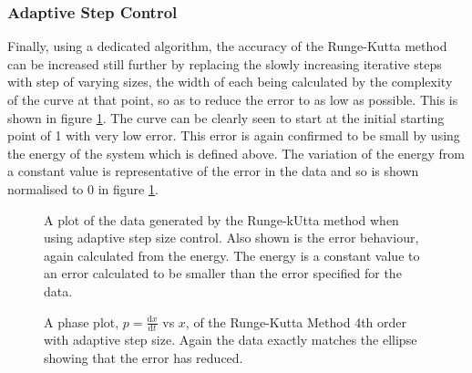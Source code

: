 \documentclass[11pt]{article} %
\newcommand{\inputTikZ}[1]{%
	}
\newcommand{\inputTikZ}[1]{%
		\beginpgfgraphicnamed{#1-external}%
		\endpgfgraphicnamed%
	}
\newcommand{\dx}[2]{\frac{\textrm{d} #1}{\textrm{d} #2}} %
\begin{document}
\subsubsection{Adaptive Step Control}
Finally, using a dedicated algorithm, the accuracy of the Runge-Kutta method can be increased still further by replacing the slowly increasing iterative steps with step of varying sizes, the width of each being calculated by the complexity of the curve at that point, so as to reduce the error to as low as possible. This is shown in figure \ref{fig:stepcontrol}. The curve can be clearly seen to start at the initial starting point of 1 with very low error. This error is again confirmed to be small by using the energy of the system which is defined above. The variation of the energy from a constant value is representative of the error in the data and so is shown normalised to 0 in figure \ref{fig:stepcontrol}.
\begin{figure}[ht]
	\centering
		\inputTikZ{Graph6}
	\caption{\label{fig:stepcontrol}A plot of the data generated by the Runge-kUtta method when using adaptive step size control. Also shown is the error behaviour, again calculated from the energy. The energy is a constant value to an error calculated to be smaller than the error specified for the data.}
\end{figure}

\begin{figure}[ht]
	\centering
		\inputTikZ{Graph7}
	\caption{\label{fig:phase3}A phase plot, $p=\dx{x}{t}$ vs $x$, of the Runge-Kutta Method 4th order with adaptive step size. Again the data exactly matches the ellipse showing that the error has reduced.}
\end{figure}
\end{document}
